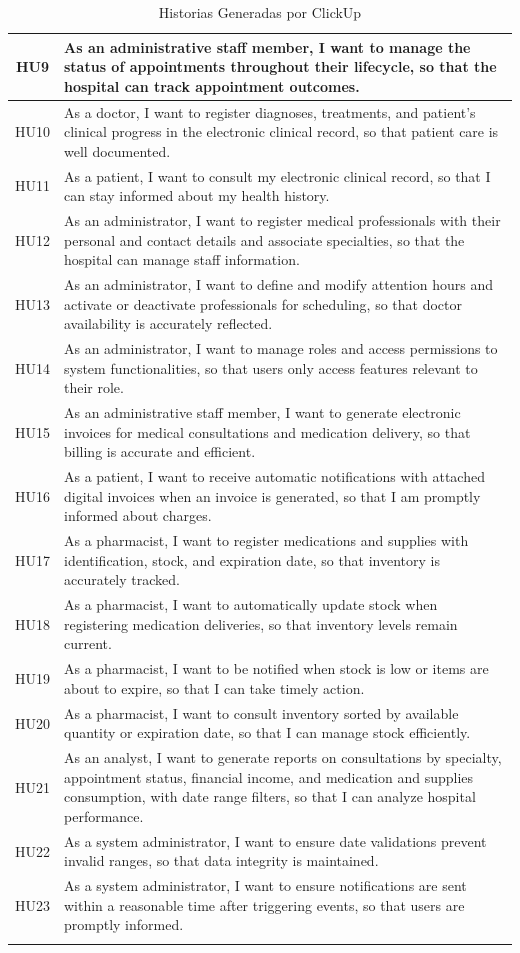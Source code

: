 \begin{longtable}{|c|p{12cm}|}
HU9 & As an administrative staff member, I want to manage the status of appointments throughout their lifecycle, so that the hospital can track appointment outcomes. \\
\hline
HU10 & As a doctor, I want to register diagnoses, treatments, and patient’s clinical progress in the electronic clinical record, so that patient care is well documented. \\
\hline
HU11 & As a patient, I want to consult my electronic clinical record, so that I can stay informed about my health history. \\
\hline
HU12 & As an administrator, I want to register medical professionals with their personal and contact details and associate specialties, so that the hospital can manage staff information. \\
\hline
HU13 & As an administrator, I want to define and modify attention hours and activate or deactivate professionals for scheduling, so that doctor availability is accurately reflected. \\
\hline
HU14 & As an administrator, I want to manage roles and access permissions to system functionalities, so that users only access features relevant to their role. \\
\hline
HU15 & As an administrative staff member, I want to generate electronic invoices for medical consultations and medication delivery, so that billing is accurate and efficient. \\
\hline
HU16 & As a patient, I want to receive automatic notifications with attached digital invoices when an invoice is generated, so that I am promptly informed about charges. \\
\hline
HU17 & As a pharmacist, I want to register medications and supplies with identification, stock, and expiration date, so that inventory is accurately tracked. \\
\hline
HU18 & As a pharmacist, I want to automatically update stock when registering medication deliveries, so that inventory levels remain current. \\
\hline
HU19 & As a pharmacist, I want to be notified when stock is low or items are about to expire, so that I can take timely action. \\
\hline
HU20 & As a pharmacist, I want to consult inventory sorted by available quantity or expiration date, so that I can manage stock efficiently. \\
\hline
HU21 & As an analyst, I want to generate reports on consultations by specialty, appointment status, financial income, and medication and supplies consumption, with date range filters, so that I can analyze hospital performance. \\
\hline
HU22 & As a system administrator, I want to ensure date validations prevent invalid ranges, so that data integrity is maintained. \\
\hline
HU23 & As a system administrator, I want to ensure notifications are sent within a reasonable time after triggering events, so that users are promptly informed. \\
\hline
\caption{Historias Generadas por ClickUp}
\end{longtable}

